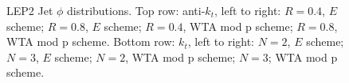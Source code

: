 \begin{figure}[H]
\hfill
{}\hfill
{}\hfill
\caption{LEP2 Jet $\phi$ distributions. Top row: anti-$k_t$, left to right: $R=0.4$, $E$ scheme; $R=0.8$, $E$ scheme; $R=0.4$, WTA mod p scheme; $R=0.8$, WTA mod p scheme. Bottom row: $k_t$, left to right: $N=2$, $E$ scheme; $N=3$, $E$ scheme; $N=2$, WTA mod p scheme; $N=3$; WTA mod p scheme.}  
\end{figure}

